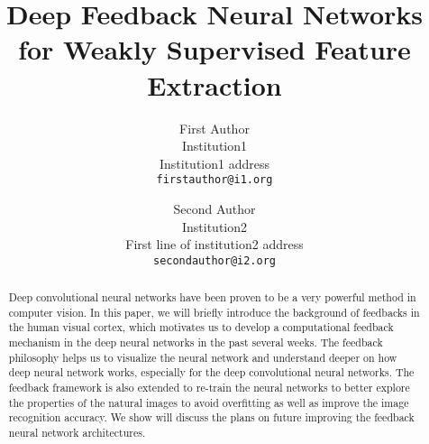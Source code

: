 \documentclass[10pt,twocolumn,letterpaper]{article}
\begin{document}
\title{Deep Feedback Neural Networks for Weakly Supervised Feature Extraction}

\author{First Author\\
Institution1\\
Institution1 address\\
{\tt\small firstauthor@i1.org}
\and
Second Author\\
Institution2\\
First line of institution2 address\\
{\tt\small secondauthor@i2.org}
}

\maketitle


\begin{abstract}
Deep convolutional neural networks have been proven to be a very powerful method in computer vision. In this paper, we will briefly introduce the background of feedbacks in the human visual cortex, which motivates us to develop a computational feedback mechanism in the deep neural networks in the past several weeks. The feedback philosophy helps us to visualize the neural network and understand deeper on how deep neural network works, especially for the deep convolutional neural networks. The feedback framework is also extended to re-train the neural networks to better explore the properties of the natural images to avoid overfitting as well as improve the image recognition accuracy. We show will discuss the plans on future improving the feedback neural network architectures.
\end{abstract}







{\small


}
\end{document}
